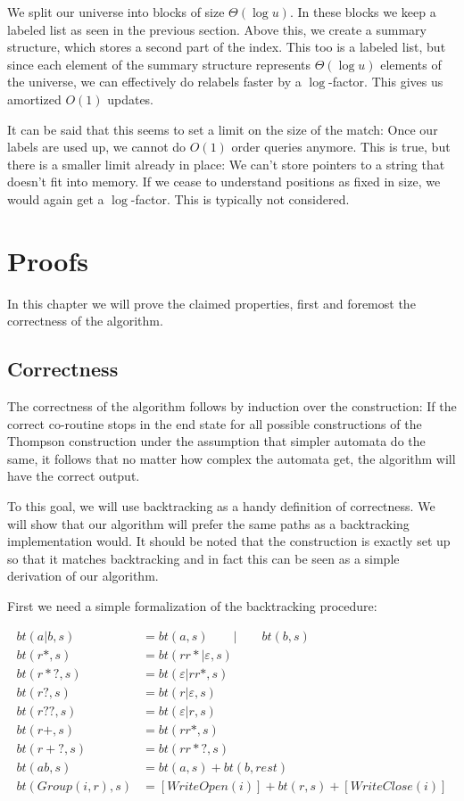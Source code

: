 \documentclass[11pt,a4paper,twoside,openright]{Thesis}
\theoremstyle{definition}
\begin{document}
We split our universe into blocks of size $\Theta(\log u)$. In these blocks we keep a
labeled list as seen in the previous section. Above this, we create a summary
structure, which stores a second part of the index. This too is a labeled
list, but since each element of the summary structure represents
$\Theta(\log u)$ elements of the universe, we can effectively do relabels
faster by a $\log$-factor. This gives us amortized $O(1)$ updates.

It can be said that this seems to set a limit on the size of the match: Once
our labels are used up, we cannot do $O(1)$ order queries anymore. This is
true, but there is a smaller limit already in place: We can't store pointers
to a string that doesn't fit into memory. If we cease to understand positions
as fixed in size, we would again get a $\log$-factor. This is typically not
considered.

\chapter{Proofs}
In this chapter we will prove the claimed properties, first and foremost the
correctness of the algorithm.

\section{Correctness}
The correctness of the algorithm follows by induction over the construction:
If the correct co-routine stops in the end state for all possible
constructions of the Thompson construction under the assumption that simpler
automata do the same, it follows that no matter how complex the automata get,
the algorithm will have the correct output.

To this goal, we will use backtracking as a handy definition of correctness.
We will show that our algorithm will prefer the same paths as a backtracking
implementation would. It should be noted that the construction is exactly
set up so that it matches backtracking and in fact this can be seen as a
simple derivation of our algorithm.

First we need a simple formalization of the backtracking procedure:

\begin{align*}
  bt(a|b, s) &= bt(a, s)\qquad | \qquad bt(b, s)\\
  bt(r*, s) &= bt(rr*|\varepsilon, s)\\
  bt(r*?, s) &= bt(\varepsilon|rr*, s)\\
  bt(r?, s) &= bt(r|\varepsilon, s)\\
  bt(r??, s) &=  bt(\varepsilon|r, s)\\
  bt(r+, s) &= bt(rr*, s)\\
  bt(r+?, s) &= bt(rr*?, s)\\
  bt(ab, s) &= bt(a, s) + bt(b, rest)\\
  bt(Group(i, r), s) &= [WriteOpen(i)] + bt(r, s) + [WriteClose(i)]
\end{align*}
\end{document}
